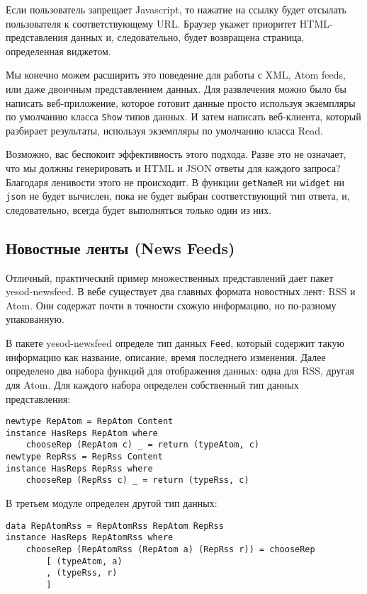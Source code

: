 Если пользователь запрещает Javascript, то нажатие на ссылку будет отсылать пользователя к соответствующему URL. Браузер укажет приоритет HTML-представления данных и, следовательно, будет возвращена страница, определенная виджетом.

Мы конечно можем расширить это поведение для работы с XML, Atom feeds, или даже двоичным представлением данных. Для развлечения можно было бы написать веб-приложение, которое готовит данные просто используя экземпляры по умолчанию класса \lstinline 'Show' типов данных. И затем написать веб-клиента, который разбирает результаты, используя экземпляры по умолчанию класса Read.

Возможно, вас беспокоит эффективность этого подхода. Разве это не означает, что мы должны генерировать и HTML и JSON ответы для каждого запроса? Благодаря ленивости этого не происходит. В функции \lstinline 'getNameR' ни \lstinline 'widget' ни \lstinline 'json' не будет вычислен, пока не будет выбран соответствующий тип ответа, и, следовательно, всегда будет выполняться только один из них.

\subsection{Новостные ленты (News Feeds)}

Отличный, практический пример множественных представлений дает пакет yesod-newsfeed. В вебе существует два главных формата новостных лент: RSS и Atom. Они содержат почти в точности схожую информацию, но по-разному упакованную.

В пакете yesod-newsfeed определе тип данных \lstinline 'Feed', который содержит такую информацию как название, описание, время последнего изменения. Далее определено два набора функций для отображения данных: одна для RSS, другая для Atom. Для каждого набора определен собственный тип данных представления:

\begin{lstlisting}
newtype RepAtom = RepAtom Content
instance HasReps RepAtom where
    chooseRep (RepAtom c) _ = return (typeAtom, c)
newtype RepRss = RepRss Content
instance HasReps RepRss where
    chooseRep (RepRss c) _ = return (typeRss, c)
\end{lstlisting}

В третьем модуле определен другой тип данных:

\begin{lstlisting}
data RepAtomRss = RepAtomRss RepAtom RepRss
instance HasReps RepAtomRss where
    chooseRep (RepAtomRss (RepAtom a) (RepRss r)) = chooseRep
        [ (typeAtom, a)
        , (typeRss, r)
        ]
\end{lstlisting}

